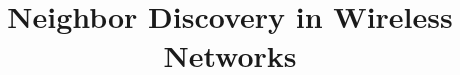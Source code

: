 \documentclass[conference]{IEEEtran}
\begin{document}
\title{Neighbor Discovery in Wireless Networks}




%




\maketitle




\IEEEpeerreviewmaketitle

















\end{document}
